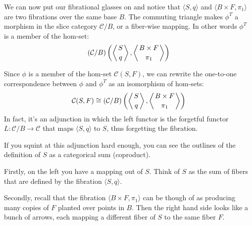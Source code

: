 \documentclass[DaoFP]{subfiles}
\begin{document}
We can now put our fibrational glasses on and notice that $\langle S, q\rangle$ and $\langle B \times F, \pi_1 \rangle$ are two fibrations over the same base $B$. The commuting triangle makes $\phi^T$ a morphism in the slice category $\mathcal{C}/B$, or a fiber-wise mapping. In other words $\phi^T$ is a member of the hom-set:
 \[ (\mathcal{C}/B) \left(\left \langle {S \atop q} \right \rangle, \left \langle {B \times F \atop \pi_1} \right \rangle \right)  \]
 
 Since $\phi$ is a member of the hom-set $ \mathcal{C}(S, F)$, we can rewrite the one-to-one correspondence between $\phi$ and $\phi^T$ as an isomorphism of hom-sets:
\[ \mathcal{C}(S, F) \cong  (\mathcal{C}/B)\left(\left \langle {S \atop q} \right \rangle, \left \langle {B \times F \atop \pi_1} \right \rangle \right)\]
In fact, it's an adjunction in which the left functor is the forgetful functor $L \colon \mathcal{C}/B \to \mathcal{C}$ that maps $\langle S, q \rangle$ to $S$, thus forgetting the fibration.

If you squint at this adjunction hard enough, you can see the outlines of the definition of $S$ as a categorical sum (coproduct). 

Firstly, on the left you have a mapping out of $S$. Think of $S$ as the sum of fibers that are defined by the fibration $\langle S, q \rangle$. 

Secondly, recall that the fibration $\langle B \times F, \pi_1 \rangle$ can be though of as producing many copies of $F$ planted over points in $B$. Then the right hand side looks like a bunch of arrows, each mapping a different fiber of $S$ to the same fiber $F$. 
\end{document}
